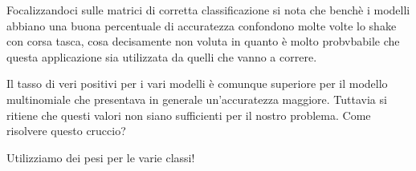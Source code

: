 %
Focalizzandoci sulle matrici di corretta classificazione si nota che benchè i modelli abbiano una buona percentuale di accuratezza confondono molte volte lo shake con corsa tasca, cosa decisamente non voluta in quanto è molto probvbabile che questa applicazione sia utilizzata da quelli che vanno a correre. 
%

%
Il tasso di veri positivi per i vari modelli è comunque superiore per il modello multinomiale che presentava in generale un'accuratezza maggiore. Tuttavia si ritiene che questi valori non siano sufficienti per il nostro problema. Come risolvere questo cruccio?
%

%
Utilizziamo dei pesi per le varie classi! 
%